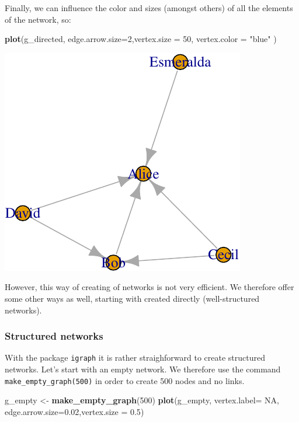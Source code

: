 \documentclass[]{article}
\newenvironment{Shaded}{\begin{snugshade}}{\end{snugshade}}
\newcommand{\KeywordTok}[1]{\textcolor[rgb]{0.13,0.29,0.53}{\textbf{#1}}}
\newcommand{\DataTypeTok}[1]{\textcolor[rgb]{0.13,0.29,0.53}{#1}}
\newcommand{\DecValTok}[1]{\textcolor[rgb]{0.00,0.00,0.81}{#1}}
\newcommand{\FloatTok}[1]{\textcolor[rgb]{0.00,0.00,0.81}{#1}}
\newcommand{\StringTok}[1]{\textcolor[rgb]{0.31,0.60,0.02}{#1}}
\newcommand{\OtherTok}[1]{\textcolor[rgb]{0.56,0.35,0.01}{#1}}
\newcommand{\NormalTok}[1]{#1}
\theoremstyle{definition}
\theoremstyle{definition}
\theoremstyle{definition}
\theoremstyle{remark}
\begin{document}
Finally, we can influence the color and sizes (amongst others) of all
the elements of the network, so:

\begin{Shaded}
\begin{Highlighting}[]
\KeywordTok{plot}\NormalTok{(g_directed, }\DataTypeTok{edge.arrow.size=}\DecValTok{2}\NormalTok{,}\DataTypeTok{vertex.size =} \DecValTok{50}\NormalTok{, }\DataTypeTok{vertex.color =} \StringTok{"blue"}\NormalTok{ )}
\end{Highlighting}
\end{Shaded}

\includegraphics{ResearchTools_files/figure-latex/unnamed-chunk-57-1.pdf}

However, this way of creating of networks is not very efficient. We
therefore offer some other ways as well, starting with created directly
(well-structured networks).

\subsubsection{Structured networks}\label{structured-networks}

With the package \texttt{igraph} it is rather straighforward to create
structured networks. Let's start with an empty network. We therefore use
the command \texttt{make\_empty\_graph(500)} in order to create 500
nodes and no links.

\begin{Shaded}
\begin{Highlighting}[]
\NormalTok{g_empty <-}\StringTok{ }\KeywordTok{make_empty_graph}\NormalTok{(}\DecValTok{500}\NormalTok{)}
\KeywordTok{plot}\NormalTok{(g_empty, }\DataTypeTok{vertex.label=} \OtherTok{NA}\NormalTok{, }\DataTypeTok{edge.arrow.size=}\FloatTok{0.02}\NormalTok{,}\DataTypeTok{vertex.size =} \FloatTok{0.5}\NormalTok{)}
\end{Highlighting}
\end{Shaded}
\end{document}

